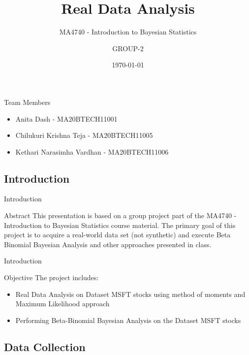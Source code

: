 \documentclass{beamer}
\title{Real Data Analysis}
\subtitle{MA4740 - Introduction to Bayesian Statistics}
\date{\today}
\author{GROUP-2}
\begin{document}
\begin{frame}
\titlepage
\end{frame}
\begin{frame}{Team Members}
\begin{itemize}
    \item Anita Dash - MA20BTECH11001
    \item Chilukuri Krishna Teja - MA20BTECH11005
    \item Kethari Narasimha Vardhan - MA20BTECH11006
\end{itemize}
\end{frame}
\begin{frame}
\section{Introduction}
\end{frame}
\begin{frame}{Introduction}
   \begin{block}{Abstract}
     This presentation is based on a group project part of the MA4740 - Introduction to Bayesian Statistics course material. The primary goal of this project is to acquire a real-world data set (not synthetic) and execute Beta Binomial Bayesian Analysis and other approaches presented in class.
   \end{block} 
\end{frame}
\begin{frame}{Introduction}
   \begin{block}{Objective}
    The project includes:
    \begin{itemize}
    \item Real Data Analysis on Dataset  MSFT stocks using method of moments and Maximum Likelihood approach
    \item Performing Beta-Binomial Bayesian Analysis on the Dataset MSFT stocks
\end{itemize}
   \end{block} 
\end{frame}
\begin{frame}
\section{Data Collection}
\end{frame}
\end{document}
